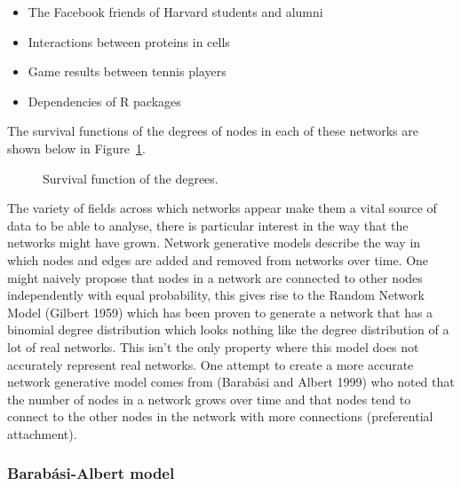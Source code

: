 \documentclass[
]{article}
\begin{document}
\begin{itemize}
\item
  The Facebook friends of Harvard students and alumni
\item
  Interactions between proteins in cells
\item
  Game results between tennis players
\item
  Dependencies of R packages
\end{itemize}

The survival functions of the degrees of nodes in each of these networks
are shown below in Figure~\ref{fig-survs}.

\begin{figure}[H]


\caption{\label{fig-survs}Survival function of the degrees.}

\end{figure}%

The variety of fields across which networks appear make them a vital
source of data to be able to analyse, there is particular interest in
the way that the networks might have grown. Network generative models
describe the way in which nodes and edges are added and removed from
networks over time. One might naively propose that nodes in a network
are connected to other nodes independently with equal probability, this
gives rise to the Random Network Model (Gilbert 1959) which has been
proven to generate a network that has a binomial degree distribution
which looks nothing like the degree distribution of a lot of real
networks. This isn't the only property where this model does not
accurately represent real networks. One attempt to create a more
accurate network generative model comes from (Barabási and Albert 1999)
who noted that the number of nodes in a network grows over time and that
nodes tend to connect to the other nodes in the network with more
connections (preferential attachment).

\subsubsection{Barabási-Albert model}\label{barabuxe1si-albert-model}
\end{document}
